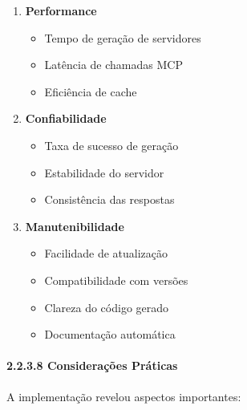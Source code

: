 \documentclass[
]{article}
\providecommand{\tightlist}{%
  \setlength{\itemsep}{0pt}\setlength{\parskip}{0pt}}
\begin{document}
\begin{enumerate}
\def\labelenumi{\arabic{enumi}.}
\tightlist
\item
  \textbf{Performance}

  \begin{itemize}
  \tightlist
  \item
    Tempo de geração de servidores
  \item
    Latência de chamadas MCP
  \item
    Eficiência de cache
  \end{itemize}
\item
  \textbf{Confiabilidade}

  \begin{itemize}
  \tightlist
  \item
    Taxa de sucesso de geração
  \item
    Estabilidade do servidor
  \item
    Consistência das respostas
  \end{itemize}
\item
  \textbf{Manutenibilidade}

  \begin{itemize}
  \tightlist
  \item
    Facilidade de atualização
  \item
    Compatibilidade com versões
  \item
    Clareza do código gerado
  \item
    Documentação automática
  \end{itemize}
\end{enumerate}

\paragraph{2.2.3.8 Considerações
Práticas}\label{considerauxe7uxf5es-pruxe1ticas-1}

A implementação revelou aspectos importantes:
\end{document}
